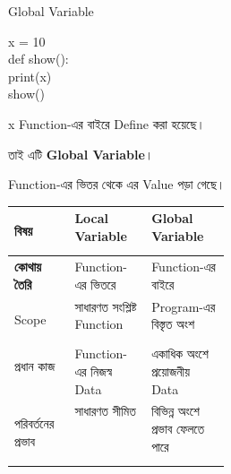 \begin{codeoutputbox}{Global Variable}

\noindent
\begin{minipage}[t]{0.52\linewidth}
\codeheading

\begin{english}
\ttfamily
x = 10\\[0.5mm]
def show():\\
\hspace*{4mm}print(x)\\[0.5mm]
show()
\end{english}

\end{minipage}
\hfill
\begin{minipage}[t]{0.44\linewidth}
\outputheading

\begin{center}
\textenglish{}
\end{center}

\textenglish{\ttfamily x}
Function-এর বাইরে Define করা হয়েছে।

তাই এটি \textbf{Global Variable}।

Function-এর ভিতর থেকে এর Value পড়া গেছে।

\end{minipage}

\end{codeoutputbox}



\begin{tabularx}
{\linewidth}
{
|>{\bfseries\RaggedRight\arraybackslash}p{0.28\linewidth}
|Y
|Y|
}

\hline
{}

\textbf{বিষয়}
&
\textbf{Local Variable}
&
\textbf{Global Variable}
\\
\hline

কোথায় তৈরি
&
Function-এর ভিতরে
&
Function-এর বাইরে
\\
\hline

Scope
&
সাধারণত সংশ্লিষ্ট Function
&
Program-এর বিস্তৃত অংশ
\\
\hline

প্রধান কাজ
&
Function-এর নিজস্ব Data
&
একাধিক অংশে প্রয়োজনীয় Data
\\
\hline

পরিবর্তনের প্রভাব
&
সাধারণত সীমিত
&
বিভিন্ন অংশে প্রভাব ফেলতে পারে
\\
\hline

\end{tabularx}

